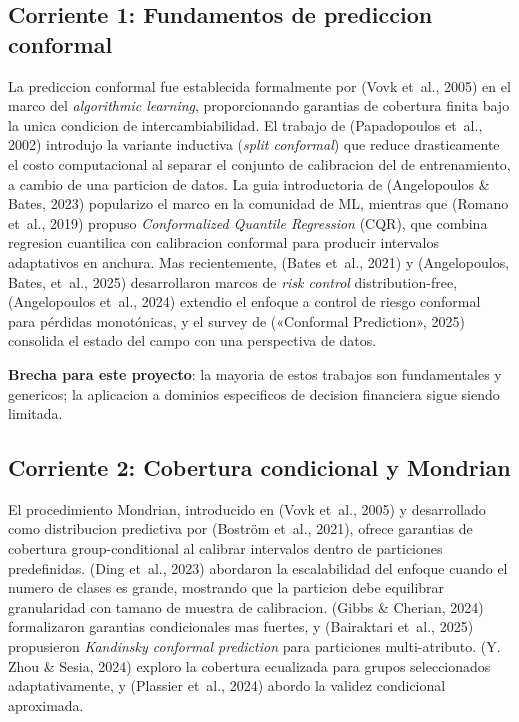 \documentclass[
  spanish,
  11pt,
  letterpaper,
]{scrbook}
\theoremstyle{plain}
\theoremstyle{remark}
\begin{document}
\subsection{Corriente 1: Fundamentos de prediccion
conformal}\label{sec-sota-foundations}

La prediccion conformal fue establecida formalmente por (Vovk et~al.,
2005) en el marco del \emph{algorithmic learning}, proporcionando
garantias de cobertura finita bajo la unica condicion de
intercambiabilidad. El trabajo de (Papadopoulos et~al., 2002) introdujo
la variante inductiva (\emph{split conformal}) que reduce drasticamente
el costo computacional al separar el conjunto de calibracion del de
entrenamiento, a cambio de una particion de datos. La guia introductoria
de (Angelopoulos \& Bates, 2023) popularizo el marco en la comunidad de
ML, mientras que (Romano et~al., 2019) propuso \emph{Conformalized
Quantile Regression} (CQR), que combina regresion cuantilica con
calibracion conformal para producir intervalos adaptativos en anchura.
Mas recientemente, (Bates et~al., 2021) y (Angelopoulos, Bates, et~al.,
2025) desarrollaron marcos de \emph{risk control} distribution-free,
(Angelopoulos et~al., 2024) extendio el enfoque a control de riesgo
conformal para pérdidas monotónicas, y el survey de ({«Conformal
Prediction»}, 2025) consolida el estado del campo con una perspectiva de
datos.

\textbf{Brecha para este proyecto}: la mayoria de estos trabajos son
fundamentales y genericos; la aplicacion a dominios especificos de
decision financiera sigue siendo limitada.

\subsection{Corriente 2: Cobertura condicional y
Mondrian}\label{sec-sota-mondrian}

El procedimiento Mondrian, introducido en (Vovk et~al., 2005) y
desarrollado como distribucion predictiva por ({Boström et~al.}, 2021),
ofrece garantias de cobertura group-conditional al calibrar intervalos
dentro de particiones predefinidas. ({Ding et~al.}, 2023) abordaron la
escalabilidad del enfoque cuando el numero de clases es grande,
mostrando que la particion debe equilibrar granularidad con tamano de
muestra de calibracion. (Gibbs \& Cherian, 2024) formalizaron garantias
condicionales mas fuertes, y ({Bairaktari et~al.}, 2025) propusieron
\emph{Kandinsky conformal prediction} para particiones multi-atributo.
(Y. Zhou \& Sesia, 2024) exploro la cobertura ecualizada para grupos
seleccionados adaptativamente, y ({Plassier et~al.}, 2024) abordo la
validez condicional aproximada.
\end{document}
